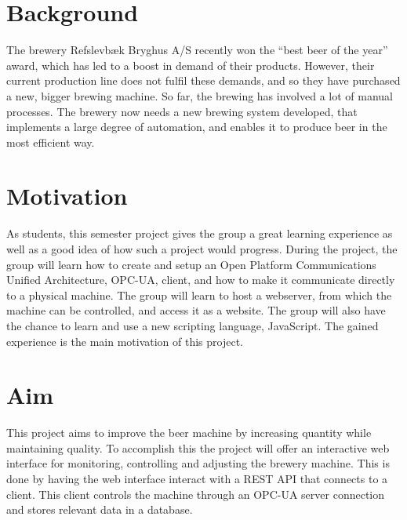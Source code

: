 \section{Background}
The brewery Refslevbæk Bryghus A/S recently won the “best beer of the year” 
award, which has led to a boost in demand of their products. However, their 
current production line does not fulfil these demands, and so they have 
purchased a new, bigger brewing machine. So far, the brewing has involved a lot 
of manual processes. The brewery now needs a new brewing system developed, that 
implements a large degree of automation, and enables it to produce beer in the 
most efficient way.

\section{Motivation}
As students,
this semester project gives the group a great learning experience as well as a
good idea of how such a project would progress. During the project, the group will learn how to create and setup an Open Platform Communications Unified Architecture, OPC-UA, client,
and how to make it communicate directly to a physical machine.
The group will learn to host a webserver, from which the machine can be controlled,
and access it as a website.
The group will also have the chance to learn and use a new scripting language, JavaScript.
The gained experience is the main motivation of this project.

\section{Aim}
This project aims to improve the beer machine by increasing quantity while 
maintaining quality. To accomplish this the project will offer an interactive 
web interface for monitoring, controlling and adjusting the brewery machine. 
This is done by having the web interface interact with a REST API that connects 
to a client. This client controls the machine through an OPC-UA server 
connection and stores relevant data in a database.



